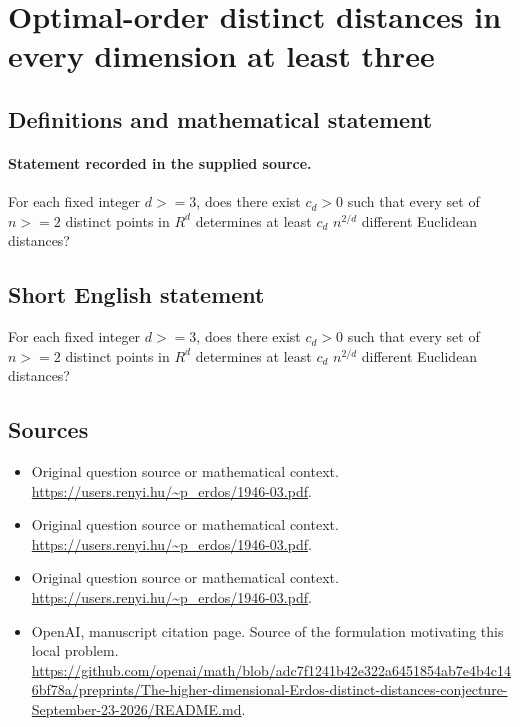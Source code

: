 \documentclass[11pt]{article}
\begin{document}
\section*{Optimal-order distinct distances in every dimension at least three}\label{statement}
\subsection{Definitions and mathematical statement}
\paragraph{Statement recorded in the supplied source.}
For each fixed integer $d>=3$, does there exist $c_d>0$ such that every set of $n>=2$ distinct points in $R^d$ determines at least $c_d$ $n^{2/d}$ different Euclidean distances?
\subsection{Short English statement}
For each fixed integer $d>=3$, does there exist $c_d>0$ such that every set of $n>=2$ distinct points in $R^d$ determines at least $c_d$ $n^{2/d}$ different Euclidean distances?
\subsection{Sources}
\begin{itemize}
\item[S1] Original question source or mathematical context.
\url{https://users.renyi.hu/~p_erdos/1946-03.pdf}.
\item[S2] Original question source or mathematical context.
\url{https://users.renyi.hu/~p_erdos/1946-03.pdf}.
\item[S3] Original question source or mathematical context.
\url{https://users.renyi.hu/~p_erdos/1946-03.pdf}.
\item[S4] OpenAI, manuscript citation page. Source of the formulation motivating this local problem.
\url{https://github.com/openai/math/blob/adc7f1241b42e322a6451854ab7e4b4c146bf78a/preprints/The-higher-dimensional-Erdos-distinct-distances-conjecture-September-23-2026/README.md}.
\end{itemize}
\end{document}
